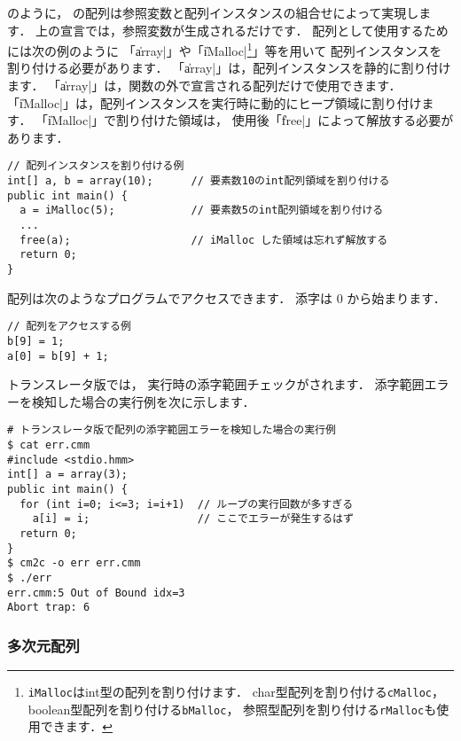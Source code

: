 のように，
\cmml の配列は参照変数と配列インスタンスの組合せによって実現します．
上の宣言では，参照変数が生成されるだけです．
配列として使用するためには次の例のように
「\|array|」や「\|iMalloc|\footnote{
\texttt{iMalloc}はint型の配列を割り付けます．
char型配列を割り付ける\texttt{cMalloc}，
boolean型配列を割り付ける\texttt{bMalloc}，
参照型配列を割り付ける\texttt{rMalloc}も使用できます．
}」等を用いて
配列インスタンスを割り付ける必要があります．
「\|array|」は，配列インスタンスを静的に割り付けます．
「\|array|」は，関数の外で宣言される配列だけで使用できます．
「\|iMalloc|」は，配列インスタンスを実行時に動的にヒープ領域に割り付けます．
「\|iMalloc|」で割り付けた領域は，
使用後「\|free|」によって解放する必要があります．

\begin{mylist}
\begin{verbatim}
// 配列インスタンスを割り付ける例
int[] a, b = array(10);      // 要素数10のint配列領域を割り付ける
public int main() {
  a = iMalloc(5);            // 要素数5のint配列領域を割り付ける
  ...
  free(a);                   // iMalloc した領域は忘れず解放する
  return 0;
}
\end{verbatim}
\end{mylist}

配列は次のようなプログラムでアクセスできます．
添字は 0 から始まります．

\begin{mylist}
\begin{verbatim}
// 配列をアクセスする例
b[9] = 1;
a[0] = b[9] + 1;
\end{verbatim}
\end{mylist}

トランスレータ版では，
実行時の添字範囲チェックがされます．
添字範囲エラーを検知した場合の実行例を次に示します．

\begin{mylist}
\begin{verbatim}
# トランスレータ版で配列の添字範囲エラーを検知した場合の実行例
$ cat err.cmm
#include <stdio.hmm>
int[] a = array(3);
public int main() {
  for (int i=0; i<=3; i=i+1)  // ループの実行回数が多すぎる
    a[i] = i;                 // ここでエラーが発生するはず
  return 0;
}
$ cm2c -o err err.cmm
$ ./err
err.cmm:5 Out of Bound idx=3
Abort trap: 6
\end{verbatim}
\end{mylist}

\subsubsection{多次元配列}

